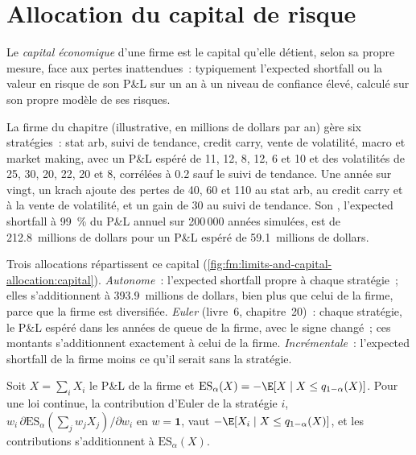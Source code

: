 \section{Allocation du capital de risque}

\begin{definition}\label{def:fm:limits-and-capital-allocation:ec}
Le \emph{capital économique} d'une firme est le capital qu'elle détient, selon sa propre mesure, face aux pertes inattendues~: typiquement
l'expected shortfall ou la valeur en risque de son P\&L sur un an à un niveau de confiance élevé, calculé sur son propre modèle de ses risques.
\end{definition}

La firme du chapitre (illustrative, en millions de dollars par an) gère six stratégies~: stat arb, suivi de tendance, credit carry, vente de volatilité, macro et market
making, avec un P\&L espéré de 11, 12, 8, 12, 6 et 10 et des volatilités de 25, 30, 20, 22, 20 et 8, corrélées à 0.2 sauf le suivi de tendance. Une année sur
vingt, un krach ajoute des pertes de 40, 60 et 110 au stat arb, au credit carry et à la vente de volatilité, et un gain de 30 au suivi de tendance. Son , l'expected shortfall à 99~\%
du P\&L annuel sur 200\,000 années simulées, est de 212.8~millions de dollars pour un P\&L espéré de 59.1~millions de dollars.

Trois allocations répartissent ce capital (\cref{fig:fm:limits-and-capital-allocation:capital}). \emph{Autonome}~: l'expected shortfall propre à chaque stratégie~;
elles s'additionnent à 393.9~millions de dollars, bien plus que celui de la firme, parce que la firme est diversifiée. \emph{Euler} (livre~6, chapitre~20)~: chaque
stratégie, le P\&L espéré dans les années de queue de la firme, avec le signe changé~; ces montants s'additionnent exactement à celui de la firme. \emph{Incrémentale}~: l'expected
shortfall de la firme moins ce qu'il serait sans la stratégie.

\begin{proposition}\label{prop:fm:limits-and-capital-allocation:euler}
Soit $X=\sum_iX_i$ le P\&L de la firme et $\mathrm{ES}_\alpha(X)=-\E[X\mid X\le q_{1-\alpha}(X)]$. Pour une loi continue, la contribution d'Euler de la
stratégie $i$, $w_i\,\partial\mathrm{ES}_\alpha(\sum_jw_jX_j)/\partial w_i$ en $w=\mathbf 1$, vaut
$-\E[X_i\mid X\le q_{1-\alpha}(X)]$, et les contributions s'additionnent à $\mathrm{ES}_\alpha(X)$.
\end{proposition}


